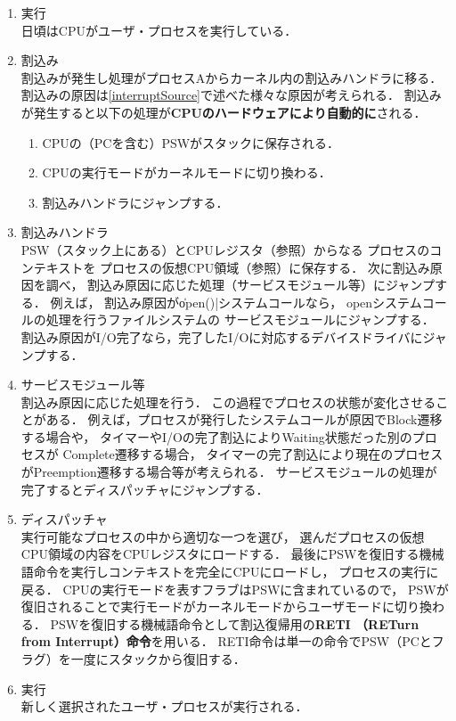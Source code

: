\begin{enumerate}
\item 実行 \\
日頃はCPUがユーザ・プロセスを実行している．

\item 割込み \\
割込みが発生し処理がプロセスAからカーネル内の割込みハンドラに移る．
割込みの原因は\ref{interruptSource}で述べた様々な原因が考えられる．
割込みが発生すると以下の処理が{\bf CPUのハードウェアにより自動的に}される．
\begin{enumerate}
\item CPUの（PCを含む）PSWがスタックに保存される．
\item CPUの実行モードがカーネルモードに切り換わる．
\item 割込みハンドラにジャンプする．
\end{enumerate}

\item 割込みハンドラ \\
PSW（スタック上にある）とCPUレジスタ（参照）からなる
プロセスのコンテキストを
プロセスの仮想CPU領域（参照）に保存する．
次に割込み原因を調べ，
割込み原因に応じた処理（サービスモジュール等）にジャンプする．
例えば，
割込み原因が\|open()|システムコールなら，
openシステムコールの処理を行うファイルシステムの
サービスモジュールにジャンプする．
割込み原因がI/O完了なら，完了したI/Oに対応するデバイスドライバにジャンプする．

\item サービスモジュール等 \\
割込み原因に応じた処理を行う．
この過程でプロセスの状態が変化させることがある．
例えば，プロセスが発行したシステムコールが原因でBlock遷移する場合や，
タイマーやI/Oの完了割込によりWaiting状態だった別のプロセスが
Complete遷移する場合，
タイマーの完了割込により現在のプロセスがPreemption遷移する場合等が考えられる．
サービスモジュールの処理が完了するとディスパッチャにジャンプする．

\item ディスパッチャ \\
実行可能なプロセスの中から適切な一つを選び，
選んだプロセスの仮想CPU領域の内容をCPUレジスタにロードする．
最後にPSWを復旧する機械語命令を実行しコンテキストを完全にCPUにロードし，
プロセスの実行に戻る．
CPUの実行モードを表すフラブはPSWに含まれているので，
PSWが復旧されることで実行モードがカーネルモードからユーザモードに切り換わる．
PSWを復旧する機械語命令として割込復帰用の{\bf RETI
（RETurn from Interrupt）命令}を用いる．
RETI命令は単一の命令でPSW（PCとフラグ）を一度にスタックから復旧する．

\item 実行 \\
新しく選択されたユーザ・プロセスが実行される．
\end{enumerate}


